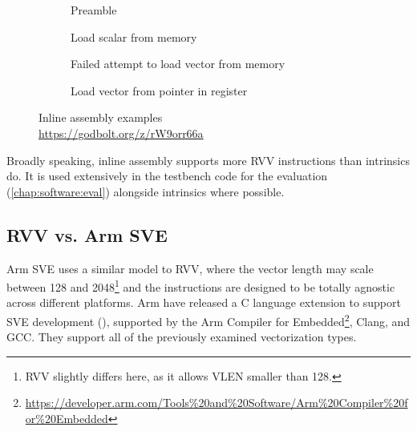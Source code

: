 \documentclass[../thesis]{subfiles}
\begin{document}
\begin{figure}[hb]
    \centering
    \begin{subfigure}{0.6\textwidth}
        \caption{Preamble}
    \end{subfigure}

    \vspace{1em}
    \begin{subfigure}{0.49\textwidth}
        \caption{Load scalar from memory}\label{subfig:inline_asm_memory}
    \end{subfigure}\hfill%
    \begin{subfigure}{0.49\textwidth}
        \caption{Failed attempt to load vector from memory}\label{subfig:inline_asm_vector_memory}
    \end{subfigure}

    \vspace{1em}
    \begin{subfigure}{0.49\textwidth}
        \caption{Load vector from pointer in register}\label{subfig:inline_asm_vector_ptr_reg}
    \end{subfigure}    

    \caption{Inline assembly examples\\\url{https://godbolt.org/z/rW9orr66a}}\label{fig:inlineasm}
\end{figure}

Broadly speaking, inline assembly supports more RVV instructions than intrinsics do.
It is used extensively in the testbench code for the evaluation (\cref{chap:software:eval}) alongside intrinsics where possible.

\pagebreak
\subsection{RVV vs. Arm SVE}\label{chap:soft:compiling:armsve}
Arm SVE uses a similar model to RVV, where the vector length may scale between 128 and 2048\footnote{RVV slightly differs here, as it allows VLEN smaller than 128.} and the instructions are designed to be totally agnostic across different platforms\cite{stephensARMScalableVector2017}.
Arm have released a C language extension to support SVE development (\cite{armltdARMLanguageExtensions2020}), supported by the Arm Compiler for Embedded\footnote{\url{https://developer.arm.com/Tools\%20and\%20Software/Arm\%20Compiler\%20for\%20Embedded}}, Clang, and GCC.
They support all of the previously examined vectorization types.
\end{document}
